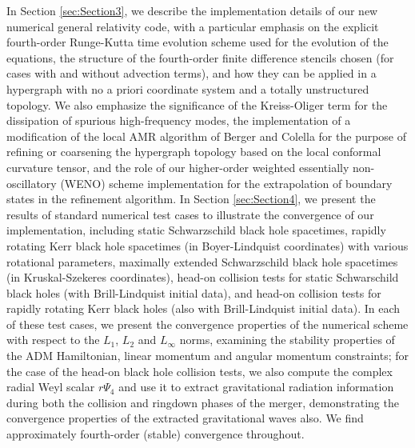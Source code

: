 \documentclass{article}
\begin{document}
In Section \ref{sec:Section3}, we describe the implementation details of our new numerical general relativity code, with a particular emphasis on the explicit fourth-order Runge-Kutta time evolution scheme used for the evolution of the equations, the structure of the fourth-order finite difference stencils chosen (for cases with and without advection terms), and how they can be applied in a hypergraph with no a priori coordinate system and a totally unstructured topology. We also emphasize the significance of the Kreiss-Oliger term\cite{kreiss} for the dissipation of spurious high-frequency modes, the implementation of a modification of the local AMR algorithm of Berger and Colella\cite{berger} for the purpose of refining or coarsening the hypergraph topology based on the local conformal curvature tensor, and the role of our higher-order weighted essentially non-oscillatory (WENO) scheme implementation for the extrapolation of boundary states in the refinement algorithm. In Section \ref{sec:Section4}, we present the results of standard numerical test cases to illustrate the convergence of our implementation, including static Schwarzschild black hole spacetimes, rapidly rotating Kerr black hole spacetimes (in Boyer-Lindquist coordinates) with various rotational parameters, maximally extended Schwarzschild black hole spacetimes (in Kruskal-Szekeres coordinates), head-on collision tests for static Schwarschild black holes (with Brill-Lindquist initial data), and head-on collision tests for rapidly rotating Kerr black holes (also with Brill-Lindquist initial data). In each of these test cases, we present the convergence properties of the numerical scheme with respect to the ${L_1}$, ${L_2}$ and ${L_{\infty}}$ norms, examining the stability properties of the ADM Hamiltonian, linear momentum and angular momentum constraints; for the case of the head-on black hole collision tests, we also compute the complex radial Weyl scalar ${r \Psi_4}$ and use it to extract gravitational radiation information during both the collision and ringdown phases of the merger, demonstrating the convergence properties of the extracted gravitational waves also. We find approximately fourth-order (stable) convergence throughout.
\end{document}
